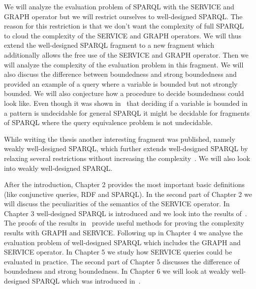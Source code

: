 We will analyze the evaluation problem of SPARQL with the SERVICE and GRAPH
operator but we will restrict ourselves to well-designed SPARQL. The reason for
this restriction is that we don't want the complexity of full SPARQL to cloud
the complexity of the SERVICE and GRAPH operators. We will thus extend the
well-designed SPARQL fragment to a new fragment which additionally allows the
free use of the SERVICE and GRAPH operator. Then we will analyze the complexity
of the evaluation problem in this fragment. We will also discuss the difference between
boundedness and strong boundedness and provided an example of a query where a
variable is bounded but not strongly bounded. We will also conjecture how a
procedure to decide boundedness could look like. Even though it was shown
in~\cite{BuilAranda20131} that deciding if a variable is bounded in a pattern is
undecidable for general SPARQL it might be decidable for fragments of SPARQL
where the query equivalence problem is not undecidable.

While writing the thesis another interesting fragment was published, namely
weakly well-designed SPARQL, which further extends well-designed SPARQL by
relaxing several restrictions without increasing the
complexity~\cite{kaminski_bwd}. We will also look into 
weakly well-designed SPARQL. 

After the introduction, Chapter 2 provides the most important basic definitions
(like conjunctive queries, RDF and SPARQL). In the second part of Chapter 2 
we will discuss the peculiarities of the semantics of the SERVICE operator. In
Chapter 3 well-designed SPARQL is introduced and
we look into the results of~\cite{pichler2014containment}. The proofs of the
results in~\cite{pichler2014containment} provide
useful methods for proving the complexity results with GRAPH and SERVICE. Following up
in Chapter 4 we analyse the evaluation problem of well-designed SPARQL which includes 
the GRAPH and SERVICE operator. In Chapter 5 we study how SERVICE queries could be evaluated in practice. 
The second part of Chapter
5 discusses the difference of boundedness and strong boundedness. In 
Chapter 6 we will look at weakly well-designed SPARQL which was introduced in~\cite{kaminski_bwd}.

